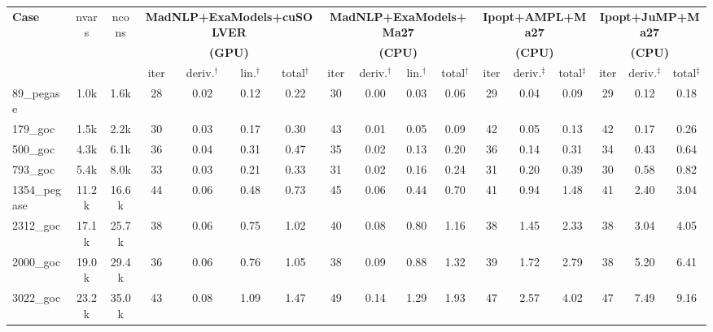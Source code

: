 \documentclass{standalone}
\begin{document}
\centering
\begin{tabular}{|l|c|c|cccc|cccc|ccc|ccc|}
  \hline
  \multirow{3}{*}{\textbf{Case}}
  & \multirow{3}{*}{nvars}
  & \multirow{3}{*}{ncons}
  & \multicolumn{4}{c|}{\textbf{MadNLP+ExaModels+cuSOLVER}}
  & \multicolumn{4}{c|}{\textbf{MadNLP+ExaModels+Ma27}}
  & \multicolumn{3}{c|}{\textbf{Ipopt+AMPL+Ma27}}
  & \multicolumn{3}{c|}{\textbf{Ipopt+JuMP+Ma27}}\\
  & & &\multicolumn{4}{c|}{\textbf{(GPU)}} &\multicolumn{4}{c|}{\textbf{(CPU)}} &\multicolumn{3}{c|}{\textbf{(CPU)}}&\multicolumn{3}{c|}{\textbf{(CPU)}}
  \\
  \cline{4-17}
  & & 
  & iter & deriv.$^\dag$ & lin.$^\dag$ & total$^\dag$
  & iter & deriv.$^\dag$ & lin.$^\dag$ & total$^\dag$
  & iter & deriv.$^\ddag$ & total$^\ddag$
  & iter & deriv.$^\ddag$ & total$^\ddag$
  \\
  \hline
89\_pegase 
&   1.0k
&   1.6k
& 28 
&  0.02
&  0.12
&  0.22
& 30 
&  0.00
&  0.03
&  0.06
& 29 
&  0.04
&  0.09
& 29 
&  0.12
&  0.18
\\

179\_goc 
&   1.5k
&   2.2k
& 30 
&  0.03
&  0.17
&  0.30
& 43 
&  0.01
&  0.05
&  0.09
& 42 
&  0.05
&  0.13
& 42 
&  0.17
&  0.26
\\

500\_goc 
&   4.3k
&   6.1k
& 36 
&  0.04
&  0.31
&  0.47
& 35 
&  0.02
&  0.13
&  0.20
& 36 
&  0.14
&  0.31
& 34 
&  0.43
&  0.64
\\

793\_goc 
&   5.4k
&   8.0k
& 33 
&  0.03
&  0.21
&  0.33
& 31 
&  0.02
&  0.16
&  0.24
& 31 
&  0.20
&  0.39
& 30 
&  0.58
&  0.82
\\

1354\_pegase 
&  11.2k
&  16.6k
& 44 
&  0.06
&  0.48
&  0.73
& 45 
&  0.06
&  0.44
&  0.70
& 41 
&  0.94
&  1.48
& 41 
&  2.40
&  3.04
\\
\hline
2312\_goc 
&  17.1k
&  25.7k
& 38 
&  0.06
&  0.75
&  1.02
& 40 
&  0.08
&  0.80
&  1.16
& 38 
&  1.45
&  2.33
& 38 
&  3.04
&  4.05
\\

2000\_goc 
&  19.0k
&  29.4k
& 36 
&  0.06
&  0.76
&  1.05
& 38 
&  0.09
&  0.88
&  1.32
& 39 
&  1.72
&  2.79
& 38 
&  5.20
&  6.41
\\

3022\_goc 
&  23.2k
&  35.0k
& 43 
&  0.08
&  1.09
&  1.47
& 49 
&  0.14
&  1.29
&  1.93
& 47 
&  2.57
&  4.02
& 47 
&  7.49
&  9.16
\\


\end{tabular}
\end{document}
